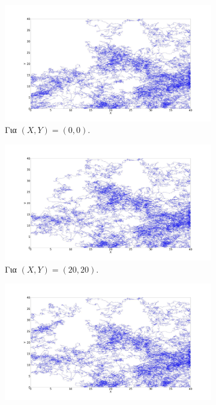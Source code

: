 \begin{figure}[ht]
	\centering
	\begin{subfigure}[b]{0.55\textwidth}
		\centering
		\includegraphics[width=\textwidth]{LateX images/log/XY1/g2-2.1}
		\caption{Για $(X,Y) = (0,0)$.}
		\label{f:g84}
	\end{subfigure}
	\hfill
	\begin{subfigure}[b]{0.55\textwidth}
		\centering
		\includegraphics[width=\textwidth]{LateX images/log/XY1/g3-2.1}
		\caption{Για $(X,Y) = (20,20)$.}
		\label{f:g85}
	\end{subfigure}
	\hfill
	\begin{subfigure}[b]{0.55\textwidth}
		\centering
		\includegraphics[width=\textwidth]{LateX images/log/XY1/g4-2.1}

\end{subfigure}
\end{figure}
